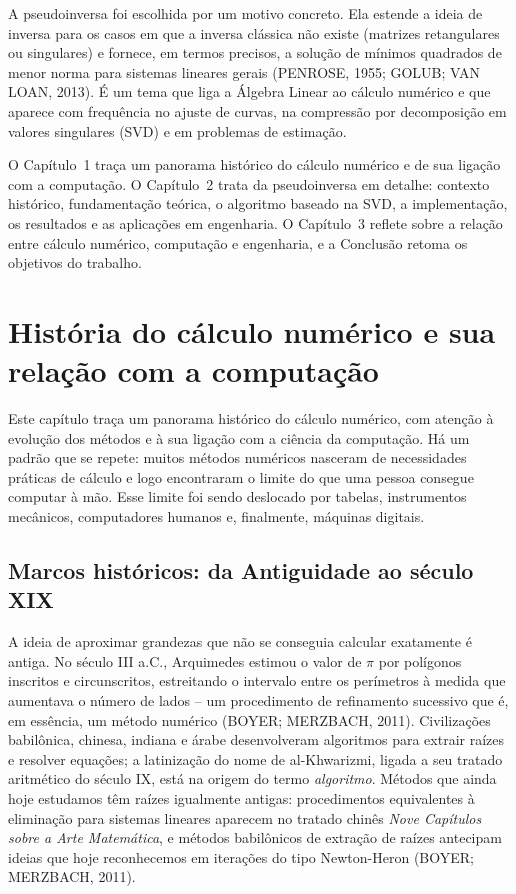 \documentclass[12pt,a4paper,oneside]{report}
\begin{document}
A pseudoinversa foi escolhida por um motivo concreto. Ela estende a ideia de inversa para os casos em que a inversa clássica não existe (matrizes retangulares ou singulares) e fornece, em termos precisos, a solução de mínimos quadrados de menor norma para sistemas lineares gerais (PENROSE, 1955; GOLUB; VAN LOAN, 2013). É um tema que liga a Álgebra Linear ao cálculo numérico e que aparece com frequência no ajuste de curvas, na compressão por decomposição em valores singulares (SVD) e em problemas de estimação.

O Capítulo~1 traça um panorama histórico do cálculo numérico e de sua ligação com a computação. O Capítulo~2 trata da pseudoinversa em detalhe: contexto histórico, fundamentação teórica, o algoritmo baseado na SVD, a implementação, os resultados e as aplicações em engenharia. O Capítulo~3 reflete sobre a relação entre cálculo numérico, computação e engenharia, e a Conclusão retoma os objetivos do trabalho.

\chapter{História do cálculo numérico e sua relação com a computação}

Este capítulo traça um panorama histórico do cálculo numérico, com atenção à evolução dos métodos e à sua ligação com a ciência da computação. Há um padrão que se repete: muitos métodos numéricos nasceram de necessidades práticas de cálculo e logo encontraram o limite do que uma pessoa consegue computar à mão. Esse limite foi sendo deslocado por tabelas, instrumentos mecânicos, computadores humanos e, finalmente, máquinas digitais.

\section{Marcos históricos: da Antiguidade ao século XIX}

A ideia de aproximar grandezas que não se conseguia calcular exatamente é antiga. No século
III a.C., Arquimedes estimou o valor de $\pi$ por polígonos inscritos e circunscritos,
estreitando o intervalo entre os perímetros à medida que aumentava o número de lados -- um
procedimento de refinamento sucessivo que é, em essência, um método numérico (BOYER;
MERZBACH, 2011). Civilizações babilônica, chinesa, indiana e árabe desenvolveram algoritmos
para extrair raízes e resolver equações; a latinização do nome de al-Khwarizmi, ligada a seu
tratado aritmético do século IX, está na origem do termo \emph{algoritmo}. Métodos que ainda hoje estudamos têm raízes igualmente antigas: procedimentos equivalentes à eliminação para sistemas lineares aparecem no tratado chinês \emph{Nove Capítulos sobre a Arte Matemática}, e métodos babilônicos de extração de raízes antecipam ideias que hoje reconhecemos em iterações do tipo Newton-Heron (BOYER; MERZBACH, 2011).
\end{document}
